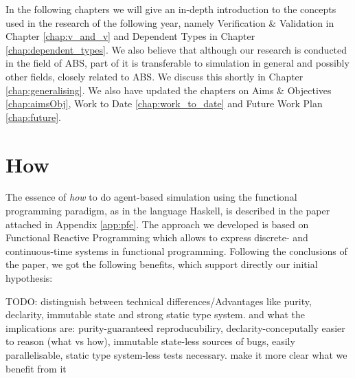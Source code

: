 In the following chapters we will give an in-depth introduction to the concepts used in the research of the following year, namely Verification \& Validation in Chapter \ref{chap:v_and_v} and Dependent Types in Chapter \ref{chap:dependent_types}. We also believe that although our research is conducted in the field of ABS, part of it is transferable to simulation in general and possibly other fields, closely related to ABS. We discuss this shortly in Chapter \ref{chap:generalising}. We also have updated the chapters on Aims \& Objectives \ref{chap:aimsObj}, Work to Date \ref{chap:work_to_date} and Future Work Plan \ref{chap:future}.

\section{How}
\label{sect:how}
The essence of \textit{how} to do agent-based simulation using the functional programming paradigm, as in the language Haskell, is described in the paper attached in Appendix \ref{app:pfe}. The approach we developed is based on Functional Reactive Programming which allows to express discrete- and continuous-time systems in functional programming. Following the conclusions of the paper, we got the following benefits, which support directly our initial hypothesis:

TODO: distinguish between technical differences/Advantages like purity, declarity, immutable state and strong static type system. and what the implications are: purity-guaranteed reproducubiliry, declarity-conceputally easier to reason (what vs how), immutable state-less sources of bugs, easily parallelisable, static type system-less tests necessary.
make it more clear what we benefit from it

